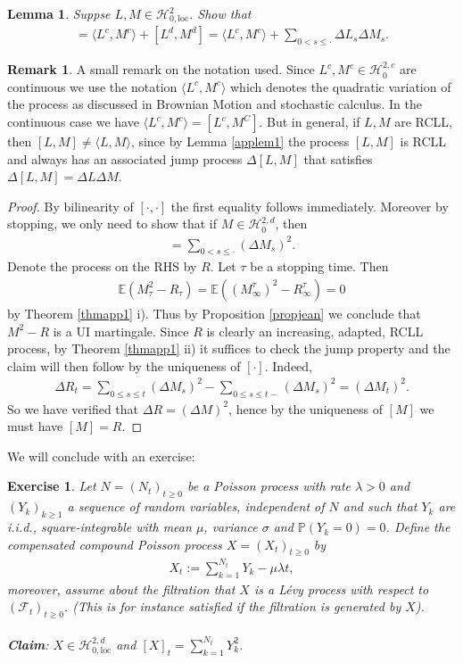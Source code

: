 \documentclass[12pt,a4paper, twoside]{article}
\newtheorem{lem}{Lemma}[section]
\newtheorem{exe}{Exercise}[section]
\theoremstyle{definition}
\newtheorem{rem}{Remark}[section]
\newcommand{\EE}{\mathbb{E}} %
\newcommand{\PP}{\mathbb{P}} %
\begin{document}
\newpage
\begin{lem} \label{lemapp4} Suppse $L,M \in \mathcal{H}_{0, \text{loc}}^2$. Show that 
\begin{align*}
[L,M]= \langle L^c,  M^c \rangle + [L^d, M^d] = \langle L^c ,  M^c \rangle + \sum_{0 < s \leq \cdot } \Delta L_s \Delta M_s. 
\end{align*}
\end{lem}
\begin{rem} A small remark on the notation used. Since $L^c,  M^c \in \mathcal{H}_0^{2,c}$ are continuous we use the notation $\langle L^c, M^c \rangle $ which denotes the quadratic variation of the process as discussed in Brownian Motion and stochastic calculus. In the continuous case we have $\langle L^c, M^c \rangle = [L^c,  M^C]$. But in general, if $L, M $ are RCLL, then $[L,M] \neq \langle L, M \rangle$, since by Lemma \ref{applem1} the process $[L,M]$ is RCLL and always has an associated jump process $\Delta[L,M]$ that satisfies $\Delta[L,M] = \Delta L \Delta M$.  
\end{rem}
\begin{proof}
By bilinearity of $[ \cdot , \cdot]$ the first equality follows immediately. Moreover by stopping, we only need to show that if $M \in \mathcal{H}_0^{2,d}$, then 
\begin{align*}
[M]= \sum_{0 < s \leq \cdot} ( \Delta M_s)^2.
\end{align*}
Denote the process on the RHS by $R$. Let $\tau$ be a stopping time. Then
\begin{align*}
\EE( M_\tau^2- R_\tau ) = \EE((M_\infty^\tau)^2- R_\infty^\tau)=0
\end{align*}
by Theorem \ref{thmapp1} i). Thus by Proposition \ref{propjean} we conclude that $M^2-R$ is a UI martingale. Since $R$ is clearly an increasing, adapted, RCLL process, by Theorem \ref{thmapp1} ii) it suffices to check the jump property and the claim will then follow by the uniqueness of $[ \cdot]$. Indeed,
\begin{align*}
\Delta R_t = \sum_{0 \leq s \leq t} ( \Delta M_s)^2 - \sum_{0 \leq s \leq t-} ( \Delta M_s)^2 = ( \Delta M_t)^2.
\end{align*}
So we have verified that $\Delta R= ( \Delta M)^2$, hence by the uniqueness of $[M]$ we must have $[M]=R$.
\end{proof}
\newpage
We will conclude with an exercise:
\begin{exe} Let $N=(N_t)_{t \geq 0}$ be a \textit{Poisson process} with rate $\lambda >0$ and $(Y_k)_{k \geq 1}$ a sequence of random variables, independent of $N$ and such that $Y_k$ are i.i.d., square-integrable with mean $\mu$, variance $\sigma$ and $\PP(Y_k=0)=0$. Define the compensated compound Poisson process $X=(X_t)_{t \geq 0}$ by 
\begin{align*}
X_t:= \sum_{k=1}^{N_t} Y_k - \mu \lambda t,
\end{align*}
moreover, assume about the filtration that $X$ is a Lévy process with respect to $( \mathcal{F}_t)_{t \geq 0}$. (This is for instance satisfied if the filtration is generated by $X$). 
\\\\
\textbf{Claim}: $X \in \mathcal{H}_{0, \text{loc}}^{2,d}$ and $[X]_t = \sum_{k=1}^{N_t} Y_k^2$. 
\end{exe}
\end{document}
